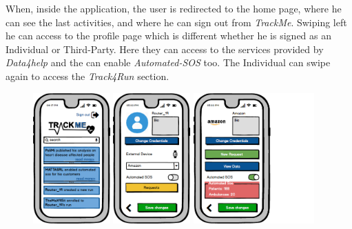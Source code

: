 \documentclass[a4paper]{article}
\begin{document}
 

When, inside the application, the user is redirected to the home page, where he can see the last activities, and where he can sign out from \textit{TrackMe}.
\newline
Swiping left he can access to the profile page which is different whether he is signed as an Individual or Third-Party. Here they can access to the services provided by \textit{Data4help} and the can enable \textit{Automated-SOS} too. The Individual can swipe again to access the \textit{Track4Run} section.

        
      
\begin{figure}[!htpb]
    	\centering
    	\includegraphics[height=50mm]{images/mockups/HomePage.png}
    	\includegraphics[height=50mm]{images/mockups/IndividualProfile.png}
    	\includegraphics[height=50mm]{images/mockups/ThirdPartyProfile.png}
        \end{figure}

\newpage
\end{document}
